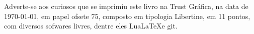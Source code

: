 \pagebreak

\ifodd\thepage\blankpage\fi

\parindent=0pt
\footnotesize\thispagestyle{empty}









\mbox{}\vfill
\begin{center}
		\begin{minipage}{.7\textwidth}\tiny\noindent{}
		\centering\tiny
		Adverte-se aos curiosos que se imprimiu este livro na Trust Gráfica, na data de \today, em papel ofsete 75, composto em tipologia Libertine, em 11 pontos, com diversos sofwares livres,
		dentre eles Lua\LaTeX e git.\\ 
		\medskip\\\
		\end{minipage}
\end{center}